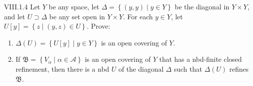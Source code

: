 \begin{problem}{VIII.1.4}
Let \( Y \) be any space, let \( \Delta = \left\{ (y, y) \mid y \in Y \right\} \) be the diagonal in \( Y \times Y \), and let \( U \supset \Delta \) be any set open in \( Y \times Y \). For each \( y \in Y \), let \( U[y] = \left\{ z \mid (y, z) \in U \right\} \). Prove:
\begin{enumerate}[label={(\alph*)}]
	\item \( \Delta(U) = \left\{ U[y] \mid y \in Y \right\} \) is an open covering of \( Y \).
	\item If \( \mathfrak{B} = \left\{ V_{\alpha} \mid \alpha \in \mathscr{A} \right\} \) is an open covering of \( Y \) that has a nbd-finite closed refinement, then there is a nbd \( U \) of the diagonal \( \Delta \) such that \( \Delta(U) \) refines \( \mathfrak{B} \).
\end{enumerate}
\end{problem}

